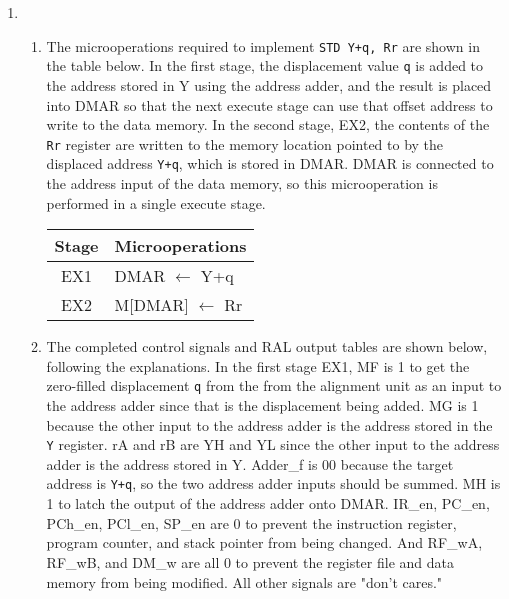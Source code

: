 \documentclass[11pt]{article}
\begin{document}
\begin{enumerate}[leftmargin=0.2in]
\item
  \begin{enumerate}
    \item The microoperations required to implement \texttt{STD Y+q, Rr} are shown in the table below. In the first stage, the displacement value \texttt{q} is added to the address stored in Y using the address adder, and the result is placed into DMAR so that the next execute stage can use that offset address to write to the data memory. In the second stage, EX2, the contents of the \texttt{Rr} register are written to the memory location pointed to by the displaced address \texttt{Y+q}, which is stored in DMAR. DMAR is connected to the address input of the data memory, so this microoperation is performed in a single execute stage.
      \begin{table}[H]
        \centering
        \begin{tabular}{|c|l|} \hline
          Stage & \multicolumn{1}{c|}{Microoperations} \\ \hline
          EX1   & DMAR $\leftarrow$ Y+q \\ \hline
          EX2   & M[DMAR] $\leftarrow$ Rr \\ \hline
        \end{tabular}
        \label{tab:2a}
      \end{table}

    \item The completed control signals and RAL output tables are shown below, following the explanations. In the first stage EX1, MF is 1 to get the zero-filled displacement \texttt{q} from the from the alignment unit as an input to the address adder since that is the displacement being added. MG is 1 because the other input to the address adder is the address stored in the \texttt{Y} register. rA and rB are YH and YL since the other input to the address adder is the address stored in Y. Adder\_f is 00 because the target address is \texttt{Y+q}, so the two address adder inputs should be summed. MH is 1 to latch the output of the address adder onto DMAR. IR\_en, PC\_en, PCh\_en, PCl\_en, SP\_en are 0 to prevent the instruction register, program counter, and stack pointer from being changed. And RF\_wA, RF\_wB, and DM\_w are all 0 to prevent the register file and data memory from being modified. All other signals are "don't cares."\\


\end{enumerate}
\end{enumerate}
\end{document}
